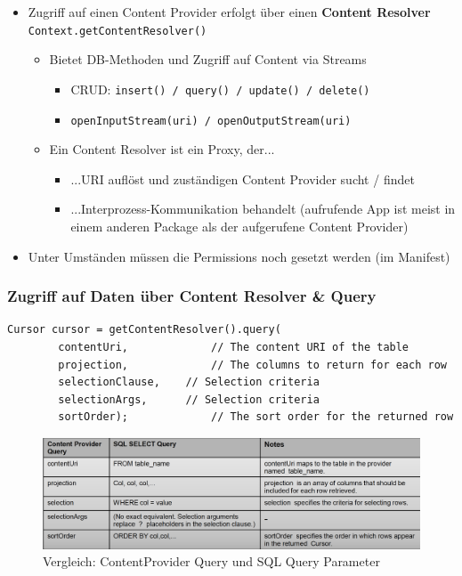 \documentclass[a4paper]{article}
\begin{document}
\begin{itemize}
	\item Zugriff auf einen Content Provider erfolgt über einen \textbf{Content Resolver}\\
	\texttt{Context.getContentResolver()}
		\begin{itemize}
			\item Bietet DB-Methoden und Zugriff auf Content via Streams
				\begin{itemize}
					\item CRUD: \texttt{insert() / query() / update() / delete()}
					\item \texttt{openInputStream(uri) / openOutputStream(uri)}
				\end{itemize}
			\item Ein Content Resolver ist ein Proxy, der...
				\begin{itemize}
					\item ...URI auflöst und zuständigen Content Provider sucht / findet
					\item ...Interprozess-Kommunikation behandelt (aufrufende App ist meist in einem anderen Package als der aufgerufene Content Provider)
				\end{itemize}
		\end{itemize}
	\item Unter Umständen müssen die Permissions noch gesetzt werden (im Manifest)
\end{itemize}
	
\subsubsection{Zugriff auf Daten über Content Resolver \& Query}	

\begin{lstlisting}
Cursor cursor = getContentResolver().query( 
		contentUri, 			// The content URI of the table 
		projection, 			// The columns to return for each row 
		selectionClause, 	// Selection criteria 
		selectionArgs, 		// Selection criteria 
		sortOrder); 			// The sort order for the returned row
\end{lstlisting}
	
\begin{figure}[htb!]
	\centering
	\includegraphics[width=\textwidth]{img/compare_query.png}
	\caption{Vergleich: ContentProvider Query und SQL Query Parameter}
\end{figure}
\end{document}
